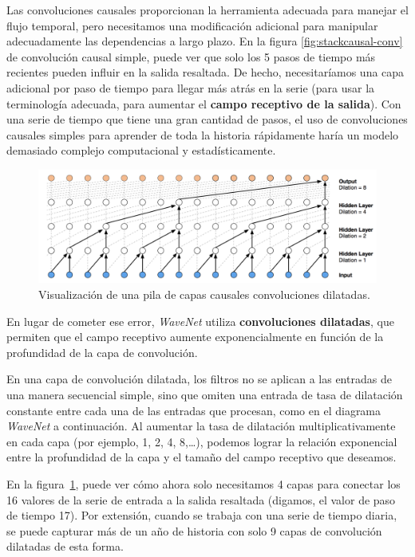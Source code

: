 \documentclass[a4paper,12pt]{article}
\begin{document}
Las convoluciones causales proporcionan la herramienta adecuada para manejar el flujo temporal, pero necesitamos una modificación adicional para manipular adecuadamente las dependencias a largo plazo. En la figura \ref{fig:stackcausal-conv} de convolución causal simple, puede ver que solo los 5 pasos de tiempo más recientes pueden influir en la salida resaltada. De hecho, necesitaríamos una capa adicional por paso de tiempo para llegar más atrás en la serie (para usar la terminología adecuada, para aumentar el \textbf{campo receptivo de la salida}). Con una serie de tiempo que tiene una gran cantidad de pasos, el uso de convoluciones causales simples para aprender de toda la historia rápidamente haría un modelo demasiado complejo computacional y estadísticamente.

\begin{figure}[H]
	\begin{center}				
		\includegraphics[width=1\textwidth]{dilated-conv.png}
		\caption{Visualización de una pila de capas causales convoluciones dilatadas. \citep{wavenet2}}
		\label{fig:dilated-conv}
	\end{center}
\end{figure}

\clearpage

En lugar de cometer ese error, \textit{WaveNet} utiliza \textbf{convoluciones dilatadas}, que permiten que el campo receptivo aumente exponencialmente en función de la profundidad de la capa de convolución. 

En una capa de convolución dilatada, los filtros no se aplican a las entradas de una manera secuencial simple, sino que omiten una entrada de tasa de dilatación constante entre cada una de las entradas que procesan, como en el diagrama \textit{WaveNet} a continuación. Al aumentar la tasa de dilatación multiplicativamente en cada capa (por ejemplo, 1, 2, 4, 8,…), podemos lograr la relación exponencial entre la profundidad de la capa y el tamaño del campo receptivo que deseamos. 

En la figura~\ref{fig:dilated-conv}, puede ver cómo ahora solo necesitamos 4 capas para conectar los 16 valores de la serie de entrada a la salida resaltada (digamos, el valor de paso de tiempo 17). Por extensión, cuando se trabaja con una serie de tiempo diaria, se puede capturar más de un año de historia con solo 9 capas de convolución dilatadas de esta forma.
\end{document}
